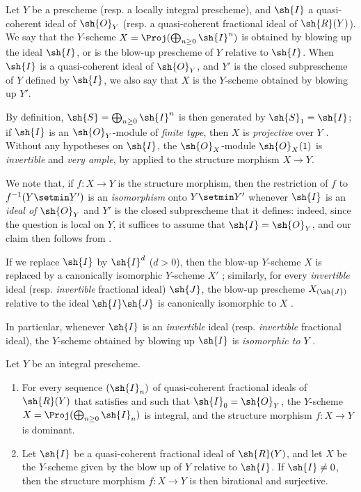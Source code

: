\begin{definition}[8.1.3]
\label{II.8.1.3}
Let $Y$ be a prescheme (resp. a locally integral prescheme), and $\sh{I}$ a quasi-coherent ideal of $\sh{O}_Y$ (resp. a quasi-coherent fractional ideal of $\sh{R}(Y)$).
We say that the $Y$-scheme $X = \Proj(\bigoplus_{n\geq0}\sh{I}^n)$ is obtained by blowing up the ideal $\sh{I}$, or is the blow-up prescheme of $Y$ relative to $\sh{I}$.
When $\sh{I}$ is a quasi-coherent ideal of $\sh{O}_Y$, and $Y'$ is the closed subprescheme of $Y$ defined by $\sh{I}$, we also say that $X$ is the $Y$-scheme obtained by blowing up $Y'$.
\end{definition}

By definition, $\sh{S} = \bigoplus_{n\geq0}\sh{I}^n$ is then generated by $\sh{S}_1 = \sh{I}$;
if $\sh{I}$ is an $\sh{O}_Y$-module of \emph{finite type}, then $X$ is \emph{projective} over $Y$ .
Without any hypotheses on $\sh{I}$, the $\sh{O}_X$-module $\sh{O}_X(1)$ is \emph{invertible}  and \emph{very ample}, by  applied to the structure morphism $X\to Y$.

We note that, if $f:X\to Y$ is the structure morphism, then the restriction of $f$ to $f^{-1}(Y\setmin Y')$ is an \emph{isomorphism} onto $Y\setmin Y'$ whenever $\sh{I}$ is an \emph{ideal of $\sh{O}_Y$} and $Y'$ is the closed subprescheme that it defines: indeed, since the question is local on $Y$, it suffices to assume that $\sh{I} = \sh{O}_Y$, and our claim then follows from .

If we replace $\sh{I}$ by $\sh{I}^d$ ($d>0$), then the blow-up $Y$-scheme $X$ is replaced by a canonically isomorphic $Y$-scheme $X'$ ;
similarly, for every \emph{invertible} ideal (resp. \emph{invertible} fractional ideal) $\sh{J}$, the blow-up prescheme $X_{(\sh{J})}$ relative to the ideal $\sh{I}\sh{J}$ is canonically isomorphic to $X$ .

In particular, whenever $\sh{I}$ is an \emph{invertible} ideal (resp. \emph{invertible} fractional ideal), the $Y$-scheme obtained by blowing up $\sh{I}$ is \emph{isomorphic to $Y$} .

\begin{proposition}[8.1.4]
\label{II.8.1.4}
Let $Y$ be an integral prescheme.
\begin{enumerate}
    \item[\rm{(i)}] For every sequence $(\sh{I}_n)$ of quasi-coherent fractional ideals of $\sh{R}(Y)$ that satisfies 
        and such that $\sh{I}_0 = \sh{O}_Y$, the $Y$-scheme $X=\Proj(\bigoplus_{n\geq0}\sh{I}_n)$ is integral, and the structure morphism $f:X\to Y$ is dominant.
    \item[\rm{(ii)}] Let $\sh{I}$ be a quasi-coherent fractional ideal of $\sh{R}(Y)$, and let $X$ be the $Y$-scheme given by the blow up of $Y$ relative to $\sh{I}$.
        If $\sh{I} \neq 0$, then the structure morphism $f:X\to Y$ is then birational and surjective.
\end{enumerate}
\end{proposition}

